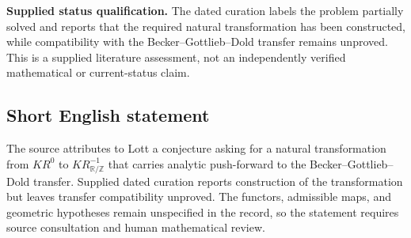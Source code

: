 \documentclass[11pt]{article}
\newcommand{\Z}{\mathbb{Z}}
\newcommand{\R}{\mathbb{R}}
\begin{document}
\textbf{Supplied status qualification.} The dated curation labels the problem partially solved and reports that the required natural transformation has been constructed, while compatibility with the Becker--Gottlieb--Dold transfer remains unproved. This is a supplied literature assessment, not an independently verified mathematical or current-status claim.
\subsection{Short English statement}
The source attributes to Lott a conjecture asking for a natural transformation from \(KR^0\) to \(KR_{\R/\Z}^{-1}\) that carries analytic push-forward to the Becker--Gottlieb--Dold transfer. Supplied dated curation reports construction of the transformation but leaves transfer compatibility unproved. The functors, admissible maps, and geometric hypotheses remain unspecified in the record, so the statement requires source consultation and human mathematical review.
\end{document}
